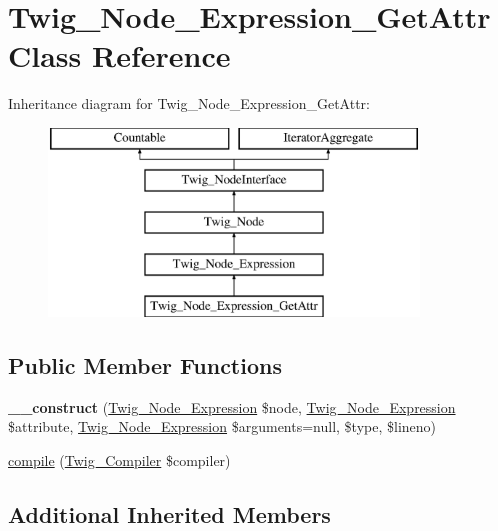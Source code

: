 \hypertarget{classTwig__Node__Expression__GetAttr}{}\section{Twig\+\_\+\+Node\+\_\+\+Expression\+\_\+\+Get\+Attr Class Reference}
\label{classTwig__Node__Expression__GetAttr}
Inheritance diagram for Twig\+\_\+\+Node\+\_\+\+Expression\+\_\+\+Get\+Attr\+:\begin{figure}[H]
\begin{center}
\leavevmode
\includegraphics[height=5.000000cm]{classTwig__Node__Expression__GetAttr}
\end{center}
\end{figure}
\subsection*{Public Member Functions}
\begin{DoxyCompactItemize}
\item 
{\bfseries \+\_\+\+\_\+construct} (\hyperlink{classTwig__Node__Expression}{Twig\+\_\+\+Node\+\_\+\+Expression} \$node, \hyperlink{classTwig__Node__Expression}{Twig\+\_\+\+Node\+\_\+\+Expression} \$attribute, \hyperlink{classTwig__Node__Expression}{Twig\+\_\+\+Node\+\_\+\+Expression} \$arguments=null, \$type, \$lineno)\hypertarget{classTwig__Node__Expression__GetAttr_a0a5473f3e993867643b418eb079fc155}{}\label{classTwig__Node__Expression__GetAttr_a0a5473f3e993867643b418eb079fc155}

\item 
\hyperlink{classTwig__Node__Expression__GetAttr_ad1a258f3438478cf0db8db8a4cafd119}{compile} (\hyperlink{classTwig__Compiler}{Twig\+\_\+\+Compiler} \$compiler)
\end{DoxyCompactItemize}
\subsection*{Additional Inherited Members}


